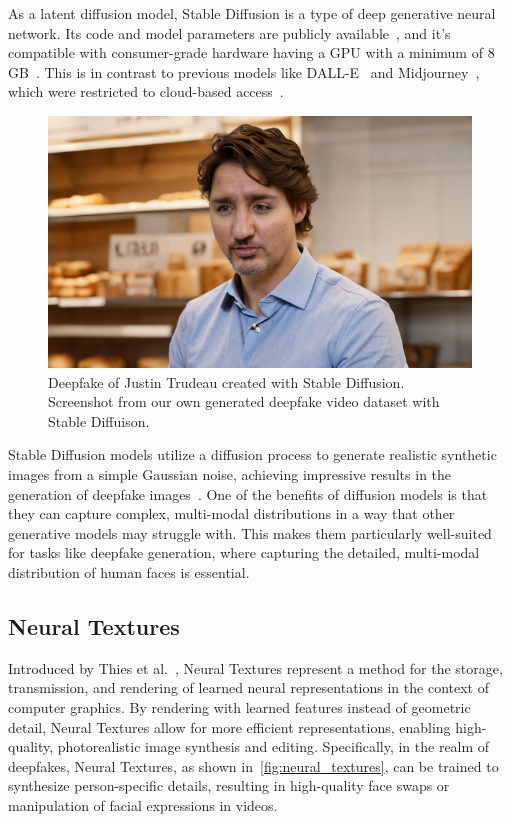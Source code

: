 As a latent diffusion model, Stable Diffusion is a type of deep generative neural network.
Its code and model parameters are publicly available~\cite{sd-github}, and it's
compatible with consumer-grade hardware having a GPU with a minimum of
8 GB~\cite{enwiki:1169859793}. This is in contrast to previous models like DALL-E~\cite{dall-e}
and Midjourney~\cite{midjourney}, which were restricted to cloud-based access~\cite{enwiki:1169859793,sd-theverge}.

\begin{figure}[htpb]
	\centering
	\includegraphics[width=0.59\columnwidth]{figures/justion-trudeau-stable-diff}
	\caption{Deepfake of Justin Trudeau created with Stable Diffusion.
		Screenshot from our own generated deepfake video dataset with Stable Diffuison.}
\end{figure}

Stable Diffusion models utilize a diffusion process to generate realistic synthetic
images from a simple Gaussian noise, achieving impressive results in the generation of
deepfake images~\cite{wu2022unifying}. One of the benefits of diffusion models
is that they can capture complex, multi-modal distributions in a way that
other generative models may struggle with. This makes them particularly
well-suited for tasks like deepfake generation, where capturing the
detailed, multi-modal distribution of human faces is essential.

\subsection{Neural Textures}
Introduced by Thies et al.~\cite{thies2019deferred}, Neural Textures represent
a method for the storage, transmission, and rendering of learned
neural representations in the context of computer graphics.
By rendering with learned features instead of geometric detail, Neural
Textures allow for more efficient representations, enabling high-quality,
photorealistic image synthesis and editing. Specifically, in the realm of
deepfakes, Neural Textures, as shown in~\autoref{fig:neural_textures}, can be trained to synthesize person-specific
details, resulting in high-quality face swaps or manipulation of facial
expressions in videos.

